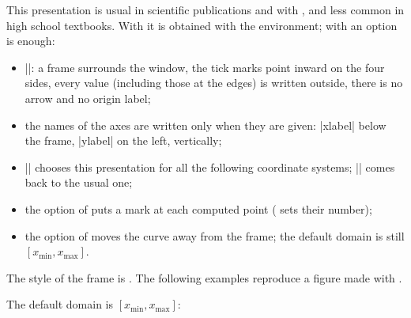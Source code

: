 This presentation is usual in scientific publications and with , and less common in high school textbooks. With  it is obtained with the  environment; with  an option is enough:

\begin{itemize}
  \item |\tkzFnAxes[box]|: a frame surrounds the window, the tick marks point inward on the four sides, every value (including those at the edges) is written outside, there is no arrow and no origin label;
  \item the names of the axes are written only when they are given: |xlabel| below the frame, |ylabel| on the left, vertically;
  \item || chooses this presentation for all the following coordinate systems; || comes back to the usual one;
  \item the option  of  puts a mark at each computed point ( sets their number);
  \item the option  of  moves the curve away from the frame; the default domain is still $[x_{\min}, x_{\max}]$.
\end{itemize}

The style of the frame is . The following examples reproduce a figure made with .

\begin{tkzexample}[latex=7cm]
\end{tkzexample}

The default domain is $[x_{\min}, x_{\max}]$:

\begin{tkzexample}[latex=7cm]
\end{tkzexample}

